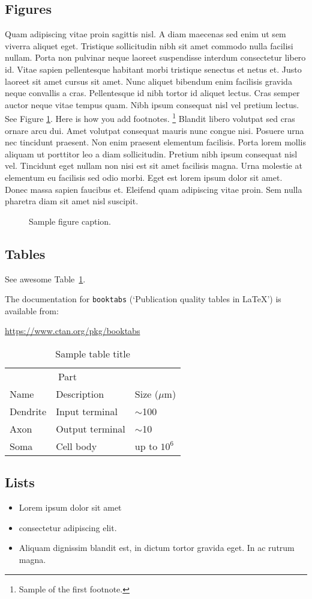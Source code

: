 \subsection{Figures}
Quam adipiscing vitae proin sagittis nisl. A diam maecenas sed enim ut sem viverra aliquet eget. Tristique sollicitudin nibh sit amet commodo nulla facilisi nullam. Porta non pulvinar neque laoreet suspendisse interdum consectetur libero id. Vitae sapien pellentesque habitant morbi tristique senectus et netus et. Justo laoreet sit amet cursus sit amet. Nunc aliquet bibendum enim facilisis gravida neque convallis a cras. Pellentesque id nibh tortor id aliquet lectus. Cras semper auctor neque vitae tempus quam. Nibh ipsum consequat nisl vel pretium lectus.
See Figure \ref{fig:fig1}. Here is how you add footnotes. \footnote{Sample of the first footnote.}
Blandit libero volutpat sed cras ornare arcu dui. Amet volutpat consequat mauris nunc congue nisi. Posuere urna nec tincidunt praesent. Non enim praesent elementum facilisis. Porta lorem mollis aliquam ut porttitor leo a diam sollicitudin. Pretium nibh ipsum consequat nisl vel. Tincidunt eget nullam non nisi est sit amet facilisis magna. Urna molestie at elementum eu facilisis sed odio morbi. Eget est lorem ipsum dolor sit amet. Donec massa sapien faucibus et. Eleifend quam adipiscing vitae proin. Sem nulla pharetra diam sit amet nisl suscipit.

\begin{figure}
	\centering
	\fbox{\rule[-.5cm]{4cm}{4cm} \rule[-.5cm]{4cm}{0cm}}
	\caption{Sample figure caption.}
	\label{fig:fig1}
\end{figure}

\subsection{Tables}
See awesome Table~\ref{tab:table}.

The documentation for \verb+booktabs+ (`Publication quality tables in LaTeX') is available from:
\begin{center}
	\url{https://www.ctan.org/pkg/booktabs}
\end{center}


\begin{table}
	\caption{Sample table title}
	\centering
	\begin{tabular}{lll}
		\toprule
		\multicolumn{2}{c}{Part}                   \\
		\cmidrule(r){1-2}
		Name     & Description     & Size ($\mu$m) \\
		\midrule
		Dendrite & Input terminal  & $\sim$100     \\
		Axon     & Output terminal & $\sim$10      \\
		Soma     & Cell body       & up to $10^6$  \\
		\bottomrule
	\end{tabular}
	\label{tab:table}
\end{table}

\subsection{Lists}
\begin{itemize}
	\item Lorem ipsum dolor sit amet
	\item consectetur adipiscing elit.
	\item Aliquam dignissim blandit est, in dictum tortor gravida eget. In ac rutrum magna.
\end{itemize}
